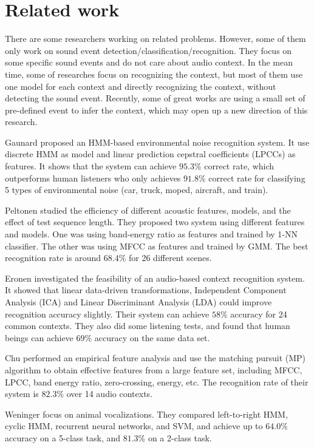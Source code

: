 \chapter{Related work}
There are some researchers working on related problems. However, some of them only work on sound event detection/classification/recognition. They focus on some specific sound events and do not care about audio context. In the mean time, some of researches focus on recognizing the context, but most of them use one model for each context and directly recognizing the context, without detecting the sound event. Recently, some of great works are using a small set of pre-defined event to infer the context, which may open up a new direction of this research.

Gaunard \et\cite{679661} proposed an HMM-based environmental noise recognition system. It use discrete HMM as model and linear prediction cepstral coefficients (LPCCs) as features. It shows that the system can achieve $95.3\%$ correct rate, which outperforms human listeners who only achieves $91.8\%$ correct rate for classifying 5 types of environmental noise (car, truck, moped, aircraft, and train).

Peltonen \et\cite{5745009} studied the efficiency of different acoustic features, models, and the effect of test sequence length. They proposed two system using different features and models. One was using band-energy ratio as features and trained by 1-NN classifier. The other was using MFCC as features and trained by GMM. The best recognition rate is around $68.4\%$ for 26 different scenes.

Eronen \et\cite{1561288} investigated the feasibility of an audio-based context recognition system. It showed that linear data-driven transformations, \ie Independent Component Analysis (ICA) and Linear Discriminant Analysis (LDA) could improve recognition accuracy slightly. Their system can achieve $58\%$ accuracy for 24 common contexts. They also did some listening tests, and found that human beings can achieve $69\%$ accuracy on the same data set.

Chu \et\cite{5109766} performed an empirical feature analysis and use the matching pursuit (MP) algorithm to obtain effective features from a large feature set, including MFCC, LPCC, band energy ratio, zero-crossing, energy, etc. The recognition rate of their system is $82.3\%$ over 14 audio contexts.

Weninger \et\cite{5946409} focus on animal vocalizations. They compared left-to-right HMM, cyclic HMM, recurrent neural networks, and SVM, and achieve up to $64.0\%$ accuracy on a 5-class task, and $81.3\%$ on a 2-class task.

